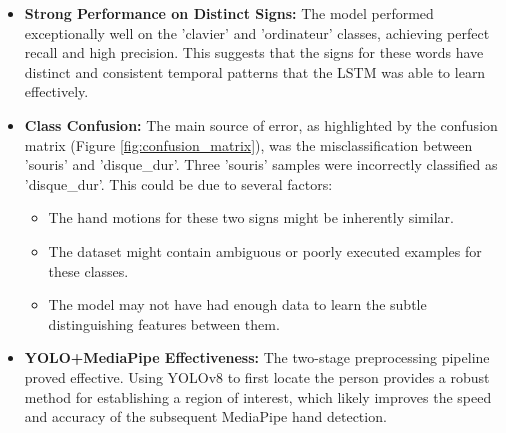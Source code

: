 \documentclass[11pt, a4paper]{article}
\begin{document}
\begin{itemize}
    \item \textbf{Strong Performance on Distinct Signs:} The model performed exceptionally well on the 'clavier' and 'ordinateur' classes, achieving perfect recall and high precision. This suggests that the signs for these words have distinct and consistent temporal patterns that the LSTM was able to learn effectively.

    \item \textbf{Class Confusion:} The main source of error, as highlighted by the confusion matrix (Figure \ref{fig:confusion_matrix}), was the misclassification between 'souris' and 'disque\_dur'. Three 'souris' samples were incorrectly classified as 'disque\_dur'. This could be due to several factors:
        \begin{itemize}
            \item The hand motions for these two signs might be inherently similar.
            \item The dataset might contain ambiguous or poorly executed examples for these classes.
            \item The model may not have had enough data to learn the subtle distinguishing features between them.
        \end{itemize}

    \item \textbf{YOLO+MediaPipe Effectiveness:} The two-stage preprocessing pipeline proved effective. Using YOLOv8 to first locate the person provides a robust method for establishing a region of interest, which likely improves the speed and accuracy of the subsequent MediaPipe hand detection.
\end{itemize}
\end{document}
